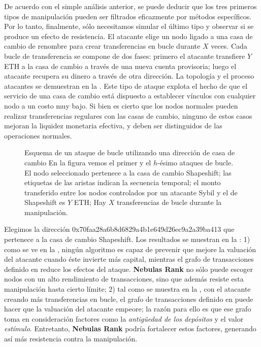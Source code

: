 De acuerdo con el simple análisis anterior, se puede deducir que los tres primeros tipos de manipulación pueden ser filtrados eficazmente por métodos específicos. Por lo tanto, finalmente, sólo necesitamos simular el último tipo y observar si se produce un efecto de resistencia. El atacante elige un nodo ligado a una casa de cambio de renombre para crear transferencias en bucle durante $X$ veces. Cada bucle de transferencia se compone de dos fases: primero el atacante transfiere $Y$ ETH a la casa de cambio a través de una nueva cuenta provisoria; luego el atacante recupera su dinero a través de otra dirección. La topología y el proceso atacantes se demuestran en la . Este tipo de ataque explota el hecho de que el servicio de una casa de cambio está dispuesto a establecer vínculos con cualquier nodo a un costo muy bajo. Si bien es cierto que los nodos normales pueden realizar transferencias regulares con las casas de cambio, ninguno de estos casos mejoran la liquidez monetaria efectiva, y deben ser distinguidos de las operaciones normales.
\begin{figure}[!ht]
	\centering
  
	\caption{Esquema de un ataque de bucle utilizando una dirección de casa de cambio \small{En la figura vemos el primer y el $h$-ésimo ataques de bucle. El nodo seleccionado pertenece a la casa de cambio Shapeshift; las etiquetas de las aristas indican la secuencia temporal; el monto transferido entre los nodos controlados por un atacante Sybil y el de Shapeshift es $Y$ ETH; Hay $X$ transferencias de bucle durante la manipulación.}}\label{fig:loop}
\end{figure}

Elegimos la dirección 0x70faa28a6b8d6829a4b1e649d26ec9a2a39ba413 que pertenece a la casa de cambio Shapeshift. Los resultados se muestran en la  : 1) como se ve en la , ningún algoritmo es capaz de prevenir que mejore la valuación del atacante cuando éste invierte más capital, mientras el grafo de transacciones definido en  reduce los efectos del ataque. \textbf{Nebulas Rank} no sólo puede escoger nodos con un alto rendimiento de transacciones, sino que además resiste esta manipulación hasta cierto límite; 2) tal como se muestra en la , con el atacante creando más transferencias en bucle, el grafo de transacciones definido en  puede hacer que la valuación del atacante empeore; la razón para ello es que ese grafo toma en consideración factores como la \textit{antigüedad de los depósitos} y el valor \textit{estímulo}. Entretanto, \textbf{Nebulas Rank} podría fortalecer estos factores, generando así más resistencia contra la manipulación.

